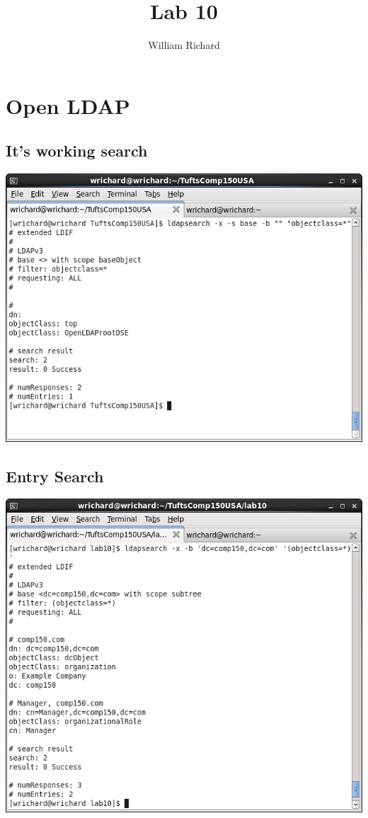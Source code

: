 \documentclass[a4paper,10pt]{article}
\title{Lab 10}
\author{William Richard}
\begin{document}
\maketitle

\section{Open LDAP}
\subsection{It's working search}
  \begin{center}
  \includegraphics[width=\linewidth]{./ldapsearch.png}
  \end{center}
\subsection{Entry Search}
  \begin{center}
  \includegraphics[width=\linewidth]{./examplecosearch.png}
  \end{center}
\end{document}
